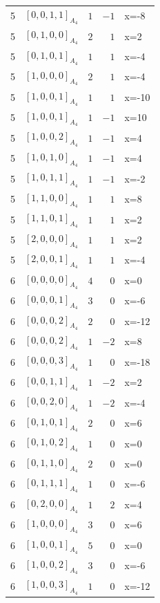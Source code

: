 \documentclass[11pt]{article}
\newcommand{\Dynkin}[1]{#1}
\begin{document}
\begin{longtable}{r l r r l}
5 & $\Dynkin{[0,0,1,1]_{A_4}}$ & $1$ & $-1$ & x=-8\\
5 & $\Dynkin{[0,1,0,0]_{A_4}}$ & $2$ & $1$ & x=2\\
5 & $\Dynkin{[0,1,0,1]_{A_4}}$ & $1$ & $1$ & x=-4\\
5 & $\Dynkin{[1,0,0,0]_{A_4}}$ & $2$ & $1$ & x=-4\\
5 & $\Dynkin{[1,0,0,1]_{A_4}}$ & $1$ & $1$ & x=-10\\
5 & $\Dynkin{[1,0,0,1]_{A_4}}$ & $1$ & $-1$ & x=10\\
5 & $\Dynkin{[1,0,0,2]_{A_4}}$ & $1$ & $-1$ & x=4\\
5 & $\Dynkin{[1,0,1,0]_{A_4}}$ & $1$ & $-1$ & x=4\\
5 & $\Dynkin{[1,0,1,1]_{A_4}}$ & $1$ & $-1$ & x=-2\\
5 & $\Dynkin{[1,1,0,0]_{A_4}}$ & $1$ & $1$ & x=8\\
5 & $\Dynkin{[1,1,0,1]_{A_4}}$ & $1$ & $1$ & x=2\\
5 & $\Dynkin{[2,0,0,0]_{A_4}}$ & $1$ & $1$ & x=2\\
5 & $\Dynkin{[2,0,0,1]_{A_4}}$ & $1$ & $1$ & x=-4\\
6 & $\Dynkin{[0,0,0,0]_{A_4}}$ & $4$ & $0$ & x=0\\
6 & $\Dynkin{[0,0,0,1]_{A_4}}$ & $3$ & $0$ & x=-6\\
6 & $\Dynkin{[0,0,0,2]_{A_4}}$ & $2$ & $0$ & x=-12\\
6 & $\Dynkin{[0,0,0,2]_{A_4}}$ & $1$ & $-2$ & x=8\\
6 & $\Dynkin{[0,0,0,3]_{A_4}}$ & $1$ & $0$ & x=-18\\
6 & $\Dynkin{[0,0,1,1]_{A_4}}$ & $1$ & $-2$ & x=2\\
6 & $\Dynkin{[0,0,2,0]_{A_4}}$ & $1$ & $-2$ & x=-4\\
6 & $\Dynkin{[0,1,0,1]_{A_4}}$ & $2$ & $0$ & x=6\\
6 & $\Dynkin{[0,1,0,2]_{A_4}}$ & $1$ & $0$ & x=0\\
6 & $\Dynkin{[0,1,1,0]_{A_4}}$ & $2$ & $0$ & x=0\\
6 & $\Dynkin{[0,1,1,1]_{A_4}}$ & $1$ & $0$ & x=-6\\
6 & $\Dynkin{[0,2,0,0]_{A_4}}$ & $1$ & $2$ & x=4\\
6 & $\Dynkin{[1,0,0,0]_{A_4}}$ & $3$ & $0$ & x=6\\
6 & $\Dynkin{[1,0,0,1]_{A_4}}$ & $5$ & $0$ & x=0\\
6 & $\Dynkin{[1,0,0,2]_{A_4}}$ & $3$ & $0$ & x=-6\\
6 & $\Dynkin{[1,0,0,3]_{A_4}}$ & $1$ & $0$ & x=-12\\

\end{longtable}
\end{document}
